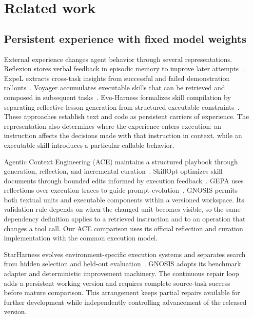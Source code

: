 \documentclass{ecai}
\begin{document}
\section{Related work}
\label{sec:related}

\subsection{Persistent experience with fixed model weights}

External experience changes agent behavior through several representations. Reflexion stores verbal feedback in episodic memory to improve later attempts~\cite{reflexion}. ExpeL extracts cross-task insights from successful and failed demonstration rollouts~\cite{expel}. Voyager accumulates executable skills that can be retrieved and composed in subsequent tasks~\cite{voyager}. Evo-Harness formalizes skill compilation by separating reflective lesson generation from structured executable constraints~\cite{evoharness}. These approaches establish text and code as persistent carriers of experience. The representation also determines where the experience enters execution: an instruction affects the decisions made with that instruction in context, while an executable skill introduces a particular callable behavior.

Agentic Context Engineering (ACE) maintains a structured playbook through generation, reflection, and incremental curation~\cite{ace}. SkillOpt optimizes skill documents through bounded edits informed by execution feedback~\cite{skillopt}. GEPA uses reflections over execution traces to guide prompt evolution~\cite{gepa}. GNOSIS permits both textual units and executable components within a versioned workspace. Its validation rule depends on when the changed unit becomes visible, so the same dependency definition applies to a retrieved instruction and to an operation that changes a tool call. Our ACE comparison uses its official reflection and curation implementation with the common execution model.

StarHarness evolves environment-specific execution systems and separates search from hidden selection and held-out evaluation~\cite{starharness}. GNOSIS adopts its benchmark adapter and deterministic improvement machinery. The continuous repair loop adds a persistent working version and requires complete source-task success before mature comparison. This arrangement keeps partial repairs available for further development while independently controlling advancement of the released version.
\end{document}
